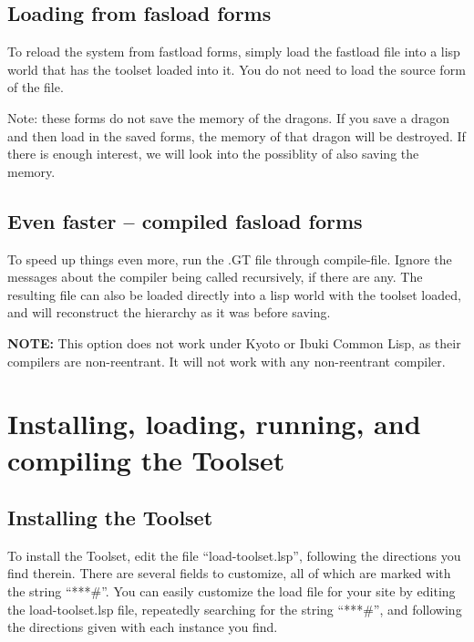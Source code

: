 \section{Loading from fasload forms}

To reload the system from fastload forms, simply load the fastload
file into a lisp world that has the toolset loaded into it. You do
not need to load the source form of the file. 

Note: these forms do not save the memory of the dragons. If you save
a dragon and then load in the saved forms, the memory of that dragon
will be destroyed. If there is enough interest, we will look into
the possiblity of also saving the memory.


\section{Even faster -- compiled fasload forms}

To speed up things even more, run the .GT file through compile-file.
Ignore the messages about the compiler being called recursively, if there
are any. The resulting file can also be loaded directly into a lisp world
with the toolset loaded, and will reconstruct the hierarchy as it was
before saving.

{\bf NOTE:} This option does not work under Kyoto or Ibuki Common
Lisp, as their compilers are non-reentrant. It will not work with
any non-reentrant compiler.



\appendix
\chapter{Installing, loading, running, and compiling the Toolset}

\section{Installing the Toolset}

To install the Toolset, edit the file ``load-toolset.lsp'', following
the directions you find therein. There are several fields to customize,
all of which are marked with the string ``***\#''. You can easily
customize the load file for your site by editing the load-toolset.lsp
file, repeatedly searching for the string ``***\#'', and following the
directions given with each instance you find.

